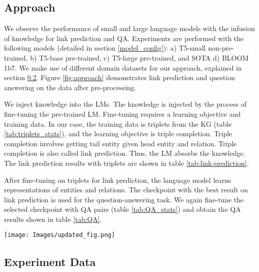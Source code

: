 \documentclass[11pt]{article}
\begin{document}
\subsection{Approach}
\label{approach}
We observe the performance of small and large language models with the infusion of knowledge for link prediction and QA. Experiments are performed with the following models (detailed in section \ref{model_config}): a) T5-small non-pre-trained, b) T5-base pre-trained, c) T5-large pre-trained, and SOTA d) BLOOM 1b7.
We make use of different domain datasets for our approach, explained in section \ref{exp_data}. Figure \ref{fig:approach} demonstrates link prediction and question answering on the data after pre-processing.
\par
 We inject knowledge into the LMs. The knowledge is injected by the process of fine-tuning the pre-trained LM. Fine-tuning requires a learning objective and training data. In our case, the training data is triplets from the KG (table \ref{tab:triplets_stats}), and the learning objective is triple completion. Triple completion involves getting 
tail entity given head entity 
and relation. Triple completion is also called link prediction. Thus, the LM absorbs the knowledge. The link prediction results with triplets are shown in table \ref{tab:link-prediction}.
\par
After fine-tuning on triplets for link prediction, the language model learns representations of entities and relations. The checkpoint with the best result on link prediction is used for the question-answering task. We again fine-tune the selected checkpoint with QA pairs (table \ref{tab:QA_stats}) and obtain the QA results shown in table \ref{tab:QA}.
\begin{figure*}[h]
  \centering
  \texttt{[image: Images/updated\_fig.png]}
  \caption{Flow diagram of the approach adopted in our paper. The model is first fine-tuned on KG triplets for Link Prediction. Next, the fine-tuned model is again fine-tuned on question answering. Because of the link-prediction task, the model learns KG completion and can answer multi-hop questions. E.g., If the model knows India's capital is New Delhi and New Delhi's area size, then the model should predict the area of India's capital correctly without explicitly mentioning New Delhi in the question}
  \label{fig:approach}
\end{figure*}


\subsection{Experiment Data} \label{exp_data}
\end{document}
